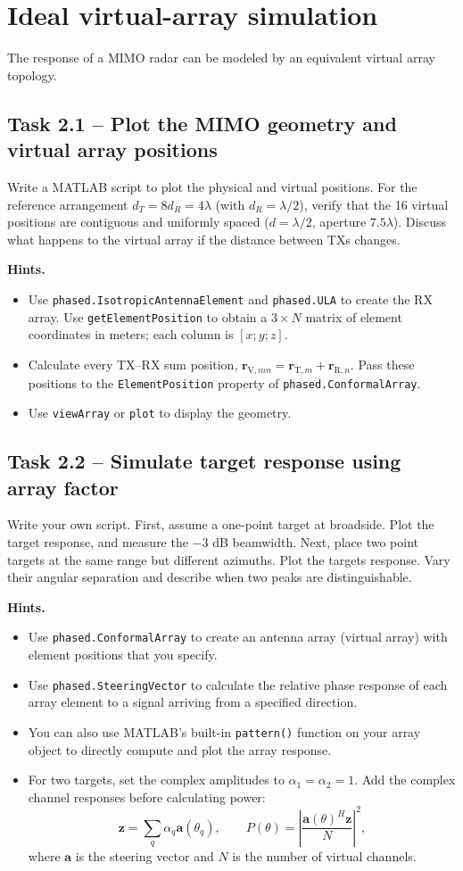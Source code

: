 \documentclass[11pt,a4paper]{article}
\newcommand{\task}[2]{\subsection*{Task #1 -- #2}}
\begin{document}
\section{Ideal virtual-array simulation}

The response of a MIMO radar can be modeled by an equivalent virtual array topology.

\task{2.1}{Plot the MIMO geometry and virtual array positions}
Write a MATLAB script to plot the physical and virtual positions. For the reference arrangement
$d_T=8d_R=4\lambda$ (with $d_R=\lambda/2$), verify that the 16 virtual positions are contiguous and uniformly
spaced ($d=\lambda/2$, aperture $7.5\lambda$). Discuss what happens to the virtual array if the distance between TXs changes.

\textbf{Hints.}
\begin{itemize}
\item Use \texttt{phased.IsotropicAntennaElement} and \texttt{phased.ULA}
to create the RX array. Use \texttt{getElementPosition} to obtain a
$3\times N$ matrix of element coordinates in meters; each column is $[x;y;z]$.
\item Calculate every TX--RX sum position,
$\mathbf r_{\mathrm V,mn}=\mathbf r_{\mathrm T,m}+\mathbf r_{\mathrm R,n}$.
Pass these positions to the \texttt{ElementPosition} property of
\texttt{phased.ConformalArray}.
\item Use \texttt{viewArray} or \texttt{plot} to display the geometry.
\end{itemize}

\task{2.2}{Simulate target response using array factor}
Write your own script. First, assume a one-point target at broadside. Plot the target response, and measure the
$-3$ dB beamwidth. Next, place two point targets at the same range but different azimuths. Plot the targets response. Vary their angular separation and describe when two peaks are distinguishable.

\textbf{Hints.}
\begin{itemize}
\item Use \texttt{phased.ConformalArray} to create an antenna array (virtual array) with element positions that you specify.
\item Use \texttt{phased.SteeringVector} to calculate the relative phase response of each array element to a signal arriving from a specified direction.
\item You can also use MATLAB's built-in \texttt{pattern()} function on your array object to directly compute and plot the array response.
\item For two targets, set the complex amplitudes to $\alpha_1=\alpha_2=1$.
Add the complex channel responses before calculating power:
\[
\mathbf z=\sum_q\alpha_q\mathbf a(\theta_q),\qquad
P(\theta)=\left|\frac{\mathbf a(\theta)^H\mathbf z}{N}\right|^2,
\]
where $\mathbf a$ is the steering vector and $N$ is the number of virtual
channels.
\end{itemize}
\end{document}
